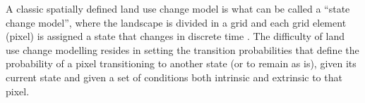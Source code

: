 \documentclass[12pt,Bold,TexShade]{mcgilletdclass}
\begin{document}
{%
%

A classic spatially defined land use change model is what can be called a “state change model”, where the landscape is divided in a grid and each grid element (pixel) is assigned a state that changes in discrete time \citep{daniel_state-and-transition_2016}. The difficulty of land use change modelling resides in setting the transition probabilities that define the probability of a pixel transitioning to another state (or to remain as is), given its current state and given a set of conditions both intrinsic and extrinsic to that pixel. \\

}
\end{document}
